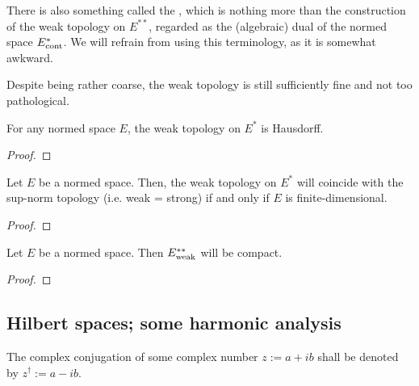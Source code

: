         \begin{convention}
            There is also something called the , which is nothing more than the construction of the weak topology on $E^{**}$, regarded as the (algebraic) dual of the normed space $E^*_{\mathrm{cont}}$. We will refrain from using this terminology, as it is somewhat awkward.
        \end{convention}
        Despite being rather coarse, the weak topology is still sufficiently fine and not too pathological.
        \begin{lemma} \label{lemma: weak_topology_is_hausdorff}
            For any normed space $E$, the weak topology on $E^*$ is Hausdorff.
        \end{lemma}
            \begin{proof}
            \end{proof}
        \begin{theorem} \label{theorem: finite_dimensional_weak_duality}
            Let $E$ be a normed space. Then, the weak topology on $E^*$ will coincide with the sup-norm topology (i.e. weak = strong) if and only if $E$ is finite-dimensional.
        \end{theorem}
            \begin{proof}
                
            \end{proof}
        \begin{theorem} \label{theorem: banach_alaoglu}
            Let $E$ be a normed space. Then $E^{**}_{\mathrm{weak}}$ will be compact.
        \end{theorem}
            \begin{proof}
                
            \end{proof}

    \subsection{Hilbert spaces; some harmonic analysis}
        \begin{convention}
            The complex conjugation of some complex number $z := a + ib$ shall be denoted by $z^{\dagger} := a - ib$.
        \end{convention}
    
